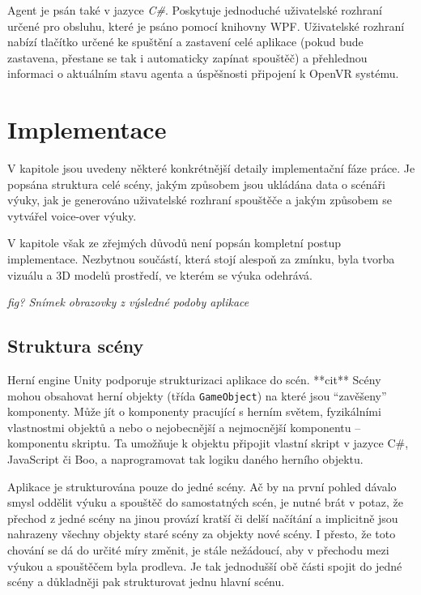 Agent je psán také v jazyce \emph{C\#}. Poskytuje jednoduché uživatelské
rozhraní určené pro obsluhu, které je psáno pomocí knihovny WPF.
Uživatelské rozhraní nabízí tlačítko určené ke spuštění a zastavení celé
aplikace (pokud bude zastavena, přestane se tak i automaticky zapínat
spouštěč) a přehlednou informaci o aktuálním stavu agenta a úspěšnosti
připojení k OpenVR systému.

\section{Implementace}\label{implementace}

V kapitole jsou uvedeny některé konkrétnější detaily implementační fáze
práce. Je popsána struktura celé scény, jakým způsobem jsou ukládána
data o scénáři výuky, jak je generováno uživatelské rozhraní spouštěče a
jakým způsobem se vytvářel voice-over výuky.

V kapitole však ze zřejmých důvodů není popsán kompletní postup
implementace. Nezbytnou součástí, která stojí alespoň za zmínku, byla
tvorba vizuálu a 3D modelů prostředí, ve kterém se výuka odehrává.

\emph{fig? Snímek obrazovky z výsledné podoby aplikace}

\subsection{Struktura scény}\label{struktura-scuxe9ny}

Herní engine Unity podporuje strukturizaci aplikace do scén. **cit** Scény mohou
obsahovat herní objekty (třída \texttt{GameObject}) na které jsou
``zavěšeny'' komponenty. Může jít o komponenty pracující s herním
světem, fyzikálními vlastnostmi objektů a nebo o nejobecnější a
nejmocnější komponentu -- komponentu skriptu. Ta umožňuje k objektu
připojit vlastní skript v jazyce C\#, JavaScript či Boo, a naprogramovat
tak logiku daného herního objektu.

Aplikace je strukturována pouze do jedné scény. Ač by na první pohled
dávalo smysl oddělit výuku a spouštěč do samostatných scén, je nutné
brát v potaz, že přechod z jedné scény na jinou provází kratší či delší
načítání a implicitně jsou nahrazeny všechny objekty staré scény za
objekty nové scény. I přesto, že toto chování se dá do určité míry
změnit, je stále nežádoucí, aby v přechodu mezi výukou a spouštěčem
byla prodleva. Je tak jednodušší obě části spojit do jedné scény a
důkladněji pak strukturovat jednu hlavní scénu.

